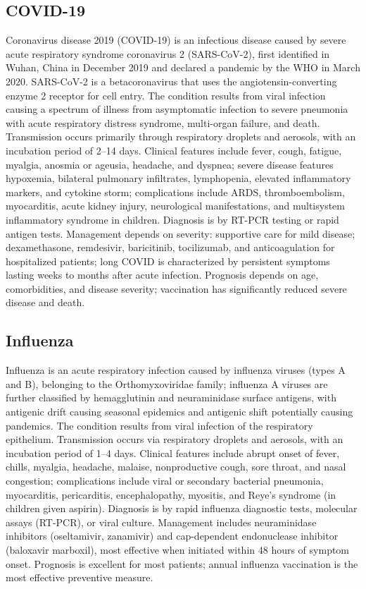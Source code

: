 \subsection{COVID-19}
\label{sec:COVID-19}
Coronavirus disease 2019 (COVID-19) is an infectious disease caused by severe acute respiratory syndrome coronavirus 2 (SARS-CoV-2), first identified in Wuhan, China in December 2019 and declared a pandemic by the WHO in March 2020. SARS-CoV-2 is a betacoronavirus that uses the angiotensin-converting enzyme 2 receptor for cell entry. The condition results from viral infection causing a spectrum of illness from asymptomatic infection to severe pneumonia with acute respiratory distress syndrome, multi-organ failure, and death. Transmission occurs primarily through respiratory droplets and aerosols, with an incubation period of 2--14 days. Clinical features include fever, cough, fatigue, myalgia, anosmia or ageusia, headache, and dyspnea; severe disease features hypoxemia, bilateral pulmonary infiltrates, lymphopenia, elevated inflammatory markers, and cytokine storm; complications include ARDS, thromboembolism, myocarditis, acute kidney injury, neurological manifestations, and multisystem inflammatory syndrome in children. Diagnosis is by RT-PCR testing or rapid antigen tests. Management depends on severity: supportive care for mild disease; dexamethasone, remdesivir, baricitinib, tocilizumab, and anticoagulation for hospitalized patients; long COVID is characterized by persistent symptoms lasting weeks to months after acute infection. Prognosis depends on age, comorbidities, and disease severity; vaccination has significantly reduced severe disease and death.

\subsection{Influenza}
\label{sec:Influenza}
Influenza is an acute respiratory infection caused by influenza viruses (types A and B), belonging to the Orthomyxoviridae family; influenza A viruses are further classified by hemagglutinin and neuraminidase surface antigens, with antigenic drift causing seasonal epidemics and antigenic shift potentially causing pandemics. The condition results from viral infection of the respiratory epithelium. Transmission occurs via respiratory droplets and aerosols, with an incubation period of 1--4 days. Clinical features include abrupt onset of fever, chills, myalgia, headache, malaise, nonproductive cough, sore throat, and nasal congestion; complications include viral or secondary bacterial pneumonia, myocarditis, pericarditis, encephalopathy, myositis, and Reye's syndrome (in children given aspirin). Diagnosis is by rapid influenza diagnostic tests, molecular assays (RT-PCR), or viral culture. Management includes neuraminidase inhibitors (oseltamivir, zanamivir) and cap-dependent endonuclease inhibitor (baloxavir marboxil), most effective when initiated within 48 hours of symptom onset. Prognosis is excellent for most patients; annual influenza vaccination is the most effective preventive measure.

